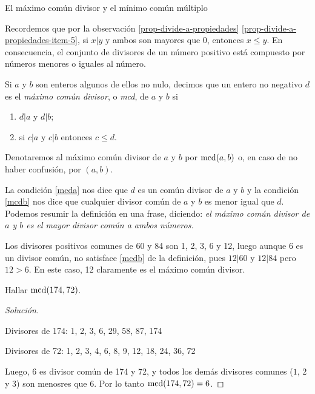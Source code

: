 \begin{section}{El máximo común divisor y el mínimo común múltiplo}\label{seccion-maximo-comun-divisor-mcm}

Recordemos que  por la observación \ref{prop-divide-a-propiedades} \ref{prop-divide-a-propiedades-item-5},  si $x|y$  y ambos son mayores que $0$,  entonces $x \le y$. En consecuencia, el conjunto de divisores de un número positivo está compuesto por números menores o iguales al número. 

\begin{definicion}\label{mcd} Si $a$ y $b$ son enteros algunos de ellos no nulo, decimos que un entero no negativo $d$ es el \textit{máximo común divisor}, o \textit{mcd}, de $a$ y $b$ si
\begin{enumerate}[label=\textit{\alph*)}]
\item\label{mcda} $ d|a$  y $d|b$;
\item\label{mcdb}  si $ c|a $ y $c|b$ entonces $ c \le d$.
\end{enumerate}
Denotaremos al máximo común divisor  de $a$ y $b$ por $\operatorname{mcd}(a,b)$ o, en caso de no haber confusión, por $(a,b)$.
\end{definicion}
 

La condición \ref{mcda} nos dice que $d$ es un común divisor de $a$ y $b$ y la condición \ref{mcdb} nos dice que cualquier divisor común de
$a$ y $b$ es menor igual que $d$. Podemos resumir la definición en una frase, diciendo: \textit{el máximo común divisor de $a$ y $b$  es el mayor divisor común a ambos números.} 

\begin{ejemplo*} \label{ejem-1-mcd}
    Los divisores positivos comunes de 60  y 84 son 1, 2, 3, 6 y 12, luego aunque 6  es un divisor común, no satisface \ref{mcdb} de la definición, pues $12|60$ y $12|84$ pero $12>6$. En este caso, 12  claramente es  el  máximo común divisor.
\end{ejemplo*}

\begin{ejemplo*} Hallar   $\operatorname{mcd}(174,72)$.
    \begin{proof}[Solución] ${^{}}$
        
        Divisores de 174: 1, 2, 3, 6, 29, 58, 87, 174
        
        Divisores de 72: 1, 2, 3, 4, 6, 8, 9, 12, 18, 24, 36, 72 
        
        Luego, $6$ es divisor común de 174 y 72, y todos los demás divisores comunes ($1$, $2$ y $3$) son menosres que  $6$. Por lo tanto $\operatorname{mcd}(174,72) =6$.
    \end{proof}
\end{ejemplo*}


\end{section}
